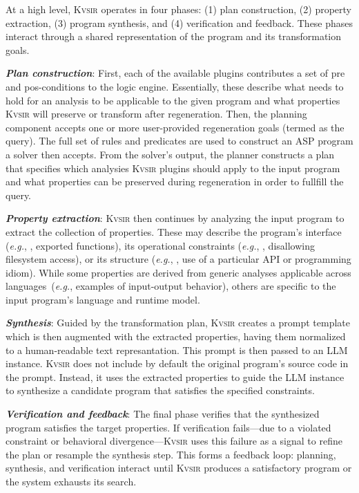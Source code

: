 \documentclass[noacm,sigplan,review]{acmart}
\def\eg{{\em e.g.}, }
\newcommand{\sys}{{\scshape Kv{\textalpha}sir}\xspace}
\newcommand{\heading}[1]{\vspace{2pt}\noindent\textbf{\emph{#1}}:\enspace}
\begin{document}
At a high level, \sys operates in four phases: (1) plan construction, (2)
property extraction, (3) program synthesis, and (4) verification and feedback.
These phases interact through a shared representation of the program and its
transformation goals.

\heading{Plan construction}
First, each of the available plugins contributes a set of pre and pos-conditions 
to the logic engine.
Essentially, these describe what needs to hold for an analysis to be applicable to the given 
program and what properties \sys will preserve or transform after regeneration.
Then, the planning component accepts one or more user-provided regeneration goals (termed as the query).
The full set of rules and predicates are used to construct an ASP program
a solver then accepts.
From the solver's output, the planner constructs a plan that specifies which
analysies \sys plugins should apply to the input program and what properties can be
preserved during regeneration in order to fullfill the query.

\heading{Property extraction} \sys then continues by analyzing the input program to
extract the collection of properties.
These may describe the program's interface
(\eg, exported functions), its operational constraints (\eg, disallowing
filesystem access), or its structure (\eg, use of a particular API or programming idiom).
While some properties are derived from generic analyses
applicable across languages~(\eg examples of input-output behavior), others are specific to the input program's language and runtime model.

\heading{Synthesis}
Guided by the transformation plan, \sys creates a prompt template which is then
augmented with the extracted properties, having them normalized to a human-readable text represantation.
This prompt is then passed to an LLM instance.
\sys does not include by default the original program's source code in the prompt.
Instead, it uses the extracted properties to guide the LLM instance 
to synthesize a candidate program that satisfies the specified constraints.

\heading{Verification and feedback}
The final phase verifies that the
synthesized program satisfies the target properties.
If verification fails---due to a violated constraint or behavioral divergence---\sys uses this
failure as a signal to refine the plan or resample the synthesis step.
This forms a feedback loop: planning, synthesis, and verification interact until \sys
produces a satisfactory program or the system exhausts its search.
\end{document}

